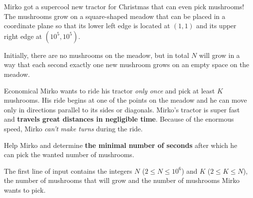 \renewcommand{\taskname}{TRAKTOR}
\renewcommand{\timelimit}{2 seconds}
\renewcommand{\memorylimit}{32 MB}
\renewcommand{\score}{100 points}

Mirko got a supercool new tractor for Christmas that can even pick mushrooms! The mushrooms grow on a square-shaped meadow that can be placed in a coordinate plane so that its lower left edge is located at $(1, 1)$ and its upper right edge at $(10^5, 10^5)$.

Initially, there are no mushrooms on the meadow, but in total $N$ will grow in a way that each second exactly one new mushroom grows on an empty space on the meadow.

Economical Mirko wants to ride his tractor \emph{only once} and pick at least $K$ mushrooms. His ride begins at one of the points on the meadow and he can move only in directions parallel to its sides or diagonals.
Mirko's tractor is super fast and \textbf{travels great distances in negligible time}. Because of the enormous speed, Mirko \emph{can't make turns} during the ride.

Help Mirko and determine \textbf{the minimal number of seconds} after which he can pick the wanted number of mushrooms.

\strut


The first line of input contains the integers $N$ ($2 \leqslant N \leqslant 10^6$) and $K$ ($2 \leqslant K \leqslant N$), the number of mushrooms that will grow and the number of mushrooms Mirko wants to pick.

